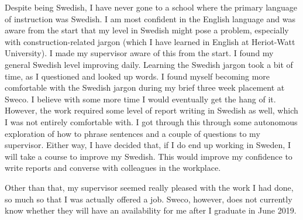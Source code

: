 Despite being Swedish, I have never gone to a school where the primary language of instruction was Swedish.
I am most confident in the English language and was aware from the start that my level in Swedish might pose a problem, especially with construction-related jargon (which I have learned in English at Heriot-Watt University).
I made my supervisor aware of this from the start.
I found my general Swedish level improving daily.
Learning the Swedish jargon took a bit of time, as I questioned and looked up words.
I found myself becoming more comfortable with the Swedish jargon during my brief three week placement at Sweco.
I believe with some more time I would eventually get the hang of it.
However, the work required some level of report writing in Swedish as well, which I was not entirely comfortable with.
I got through this through some autonomous exploration of how to phrase sentences and a couple of questions to my supervisor.
Either way, I have decided that, if I do end up working in Sweden, I will take a course to improve my Swedish.
This would improve my confidence to write reports and converse with colleagues in the workplace.

Other than that, my supervisor seemed really pleased with the work I had done, so much so that I was actually offered a job.
Sweco, however, does not currently know whether they will have an availability for me after I graduate in June 2019.
